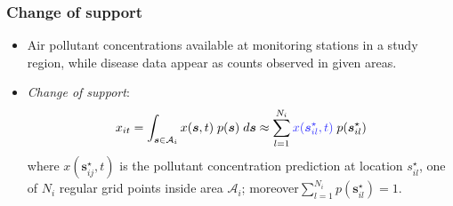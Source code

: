 \documentclass[slidestop,compress,serif,10pt]{beamer}
\begin{document}
\begin{frame}\frametitle{Change of support}
\begin{itemize}
\item<1-> Air pollutant concentrations available at monitoring stations in a study region, while disease data appear as counts observed in given areas.

\item<2-> \alert{\textit{Change of support}}:
\[
x_{it}=\int_{\bm s \in \mathcal A_i} x(\bm s,t) \; p(\bm s) \; d\bm s \approx \sum_{l=1}^{N_i} \textcolor{blue!80}{x(\bm s_{il}^\star,t)} \; p(\bm s_{il}^\star)
\]
 \small{where $x(\bm s_{ij}^\star,t)$ is the pollutant concentration prediction at location $s_{il}^\star$, one of $N_i$ \alert{regular grid points} inside area $\mathcal A_i$; moreover$ \sum_{l=1}^{N_i}p(\bm s_{il}^\star)=1$}.


\end{itemize}
\end{frame}
\end{document}
